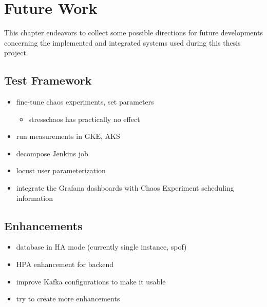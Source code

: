 \chapter{Future Work} \label{future-work}

This chapter endeavors to collect some possible directions for future developments concerning the implemented and integrated systems used during this thesis project.

\section{Test Framework}

\begin{itemize}
	\item fine-tune chaos experiments, set parameters
	\begin{itemize}
		\item stresschaos has practically no effect
	\end{itemize}
	\item run measurements in GKE, AKS
	\item decompose Jenkins job
	\item locust user parameterization
	\item integrate the Grafana dashboards with Chaos Experiment scheduling information
\end{itemize}

\section{Enhancements}

\begin{itemize}
	\item database in HA mode (currently single instance, spof)
	\item HPA enhancement for backend
	\item improve Kafka configurations to make it usable
	\item try to create more enhancements
\end{itemize}